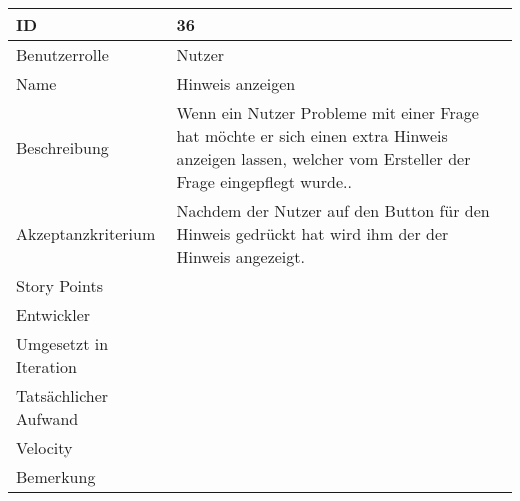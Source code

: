 \begin{tabularx}{\textwidth}{|p{}|X|}
	\hline
	ID & 36 \\
	\hline
	Benutzerrolle & Nutzer \\
	\hline
	Name & Hinweis anzeigen\\
	\hline
	Beschreibung & Wenn ein Nutzer Probleme mit einer Frage hat möchte er sich einen extra Hinweis anzeigen lassen, welcher vom Ersteller der Frage eingepflegt wurde.. \\
	\hline
	Akzeptanzkriterium & Nachdem der Nutzer auf den Button für den Hinweis gedrückt hat wird ihm der der Hinweis angezeigt. \\
	\hline
	Story Points & \\
	\hline
	Entwickler & \\
	\hline
	Umgesetzt in Iteration & \\
	\hline
	Tatsächlicher Aufwand & \\
	\hline
	Velocity & \\
	\hline
	Bemerkung & \\
	\hline
\end{tabularx}
\vspace{20pt}
